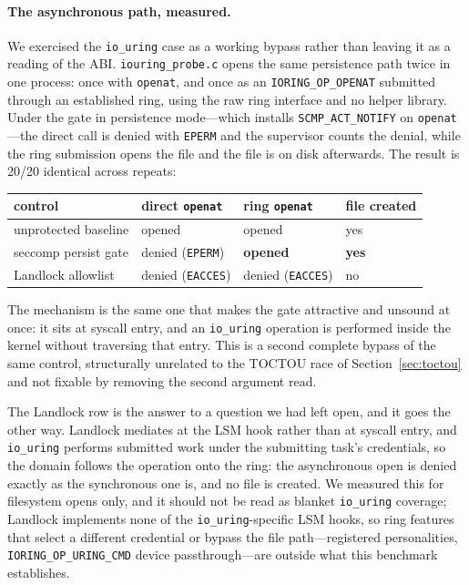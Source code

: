\documentclass[11pt]{article}
\begin{document}
\paragraph{The asynchronous path, measured.} We exercised the \texttt{io\_uring} case as a working
bypass rather than leaving it as a reading of the ABI. \texttt{iouring\_probe.c} opens the same
persistence path twice in one process: once with \texttt{openat}, and once as an
\texttt{IORING\_OP\_OPENAT} submitted through an established ring, using the raw ring interface and no
helper library. Under the gate in persistence mode---which installs
\texttt{SCMP\_ACT\_NOTIFY} on \texttt{openat}---the direct call is denied with \texttt{EPERM} and the
supervisor counts the denial, while the ring submission opens the file and the file is on disk
afterwards. The result is 20/20 identical across repeats:

\begin{center}
\begin{tabular}{llll}
\toprule
control & direct \texttt{openat} & ring \texttt{openat} & file created \\
\midrule
unprotected baseline & opened & opened & yes \\
seccomp persist gate & denied (\texttt{EPERM}) & \textbf{opened} & \textbf{yes} \\
Landlock allowlist & denied (\texttt{EACCES}) & denied (\texttt{EACCES}) & no \\
\bottomrule
\end{tabular}
\end{center}

The mechanism is the same one that makes the gate attractive and unsound at once: it sits at syscall
entry, and an \texttt{io\_uring} operation is performed inside the kernel without traversing that
entry. This is a second complete bypass of the same control, structurally unrelated to the TOCTOU race
of Section~\ref{sec:toctou} and not fixable by removing the second argument read.

The Landlock row is the answer to a question we had left open, and it goes the other way. Landlock
mediates at the LSM hook rather than at syscall entry, and \texttt{io\_uring} performs submitted work
under the submitting task's credentials, so the domain follows the operation onto the ring: the
asynchronous open is denied exactly as the synchronous one is, and no file is created. We measured
this for filesystem opens only, and it should not be read as blanket \texttt{io\_uring} coverage;
Landlock implements none of the \texttt{io\_uring}-specific LSM hooks, so ring features that select a
different credential or bypass the file path---registered personalities,
\texttt{IORING\_OP\_URING\_CMD} device passthrough---are outside what this benchmark establishes.
\end{document}
